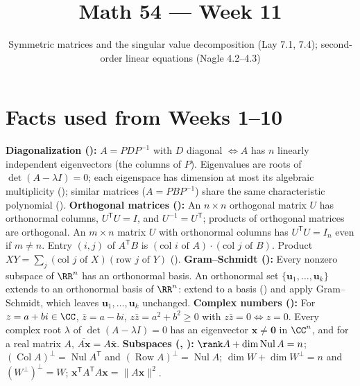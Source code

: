 \documentclass[10pt]{scrartcl}
\title{Math 54 --- Week 11}
\subtitle{Symmetric matrices and the singular value decomposition (Lay 7.1, 7.4); second-order linear equations (Nagle 4.2--4.3)}
\author{}\date{}\ihead{}
\newcommand{\vv}[1]{\mathbf{#1}}
\DeclareMathOperator{\Nul}{Nul}
\DeclareMathOperator{\Col}{Col}
\DeclareMathOperator{\Row}{Row}
\begin{document}
\maketitle

\section{Facts used from Weeks 1--10}
\begin{enumerate}[label=(W\arabic*),leftmargin=2.8em,itemsep=4pt]
  \ii {}\textbf{Diagonalization ():} $A=PDP^{-1}$ with $D$ diagonal $\iff A$ has $n$ linearly independent eigenvectors (the columns of $P$). Eigenvalues are roots of $\det(A-\lambda I)=0$; each eigenspace has dimension at most its algebraic multiplicity (); similar matrices ($A=PBP^{-1}$) share the same characteristic polynomial ().
  \ii {}\textbf{Orthogonal matrices ():} An $n\times n$ orthogonal matrix $U$ has orthonormal columns, $U^{\mathsf T}U=I$, and $U^{-1}=U^{\mathsf T}$; products of orthogonal matrices are orthogonal. An $m\times n$ matrix $U$ with orthonormal columns has $U^{\mathsf T}U=I_n$ even if $m\ne n$. Entry $(i,j)$ of $A^{\mathsf T}B$ is $(\text{col }i\text{ of }A)\cdot(\text{col }j\text{ of }B)$. Product $XY=\sum_j (\text{col }j\text{ of }X)(\text{row }j\text{ of }Y)$ ().
  \ii {}\textbf{Gram--Schmidt ():} Every nonzero subspace of $\RR^n$ has an orthonormal basis. An orthonormal set $\{\vv u_1,\dots,\vv u_k\}$ extends to an orthonormal basis of $\RR^n$: extend to a basis () and apply Gram--Schmidt, which leaves $\vv u_1,\dots,\vv u_k$ unchanged.
  \ii {}\textbf{Complex numbers ():} For $z=a+bi\in\CC$, $\bar z=a-bi$, $z\bar z=a^2+b^2\ge 0$ with $z\bar z=0\iff z=0$. Every complex root $\lambda$ of $\det(A-\lambda I)=0$ has an eigenvector $\vv x\ne\vv 0$ in $\CC^n$, and for a real matrix $A$, $\overline{A\vv x}=A\bar{\vv x}$.
  \ii {}\textbf{Subspaces (, ):} $\rank A+\dim\Nul A=n$; $(\Col A)^\perp=\Nul A^{\mathsf T}$ and $(\Row A)^\perp=\Nul A$; $\dim W+\dim W^\perp=n$ and $(W^\perp)^\perp=W$; $\vv x^{\mathsf T}A^{\mathsf T}A\vv x=\|A\vv x\|^2$.

\end{enumerate}
\end{document}
